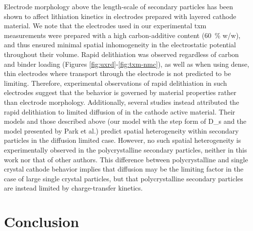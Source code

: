 \documentclass{article}
\begin{document}
Electrode morphology above the length-scale of secondary particles has
been shown to affect lithiation kinetics in electrodes prepared with
layered cathode
material\cite{battaglia2012,mukherjee2018,mukherjee2020,zhao2022}. We
note that the electrodes used in our experimental \gls{txm}
measurements were prepared with a high carbon-additive content
(\SI{60}{\percent} w/w), and thus ensured minimal spatial
inhomogeneity in the electrostatic potential throughout their
volume. Rapid delithiation was observed regardless of carbon and
binder loading (Figures \ref{fig:uxrd}-\ref{fig:txm-nmc}), as well as
when using dense, thin electrodes\cite{chueh2021} where transport
through the electrode is not predicted to be
limiting\cite{mukherjee2018}. Therefore, experimental observations of
rapid delithiation in such electrodes suggest that the behavior is
governed by material properties rather than electrode
morphology. Additionally, several studies instead attributed the rapid
delithiation to limited diffusion of  in the cathode active
material\cite{rao2021, wang2020-6}. Their models and those described
above (our model with the step form of \gls{D_s} and the model
presented by Park et al.\cite{chueh2021}) predict spatial
heterogeneity within secondary particles in the diffusion limited
case\cite{wang2020-6}. However, no such spatial heterogeneity is
experimentally observed in the polycrystalline secondary particles,
neither in this work nor that of other authors\cite{chueh2021,
  zhao2022}. This difference between polycrystalline and single
crystal cathode behavior implies that  diffusion may be the
limiting factor in the case of large single crystal particles, but
that polycrystalline secondary particles are instead limited by
charge-transfer kinetics.
 



\section{Conclusion}
\end{document}
